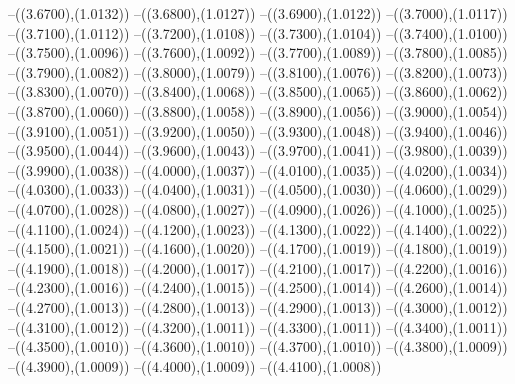 {	--({\sx*(3.6700)},{\sy*(1.0132)})
	--({\sx*(3.6800)},{\sy*(1.0127)})
	--({\sx*(3.6900)},{\sy*(1.0122)})
	--({\sx*(3.7000)},{\sy*(1.0117)})
	--({\sx*(3.7100)},{\sy*(1.0112)})
	--({\sx*(3.7200)},{\sy*(1.0108)})
	--({\sx*(3.7300)},{\sy*(1.0104)})
	--({\sx*(3.7400)},{\sy*(1.0100)})
	--({\sx*(3.7500)},{\sy*(1.0096)})
	--({\sx*(3.7600)},{\sy*(1.0092)})
	--({\sx*(3.7700)},{\sy*(1.0089)})
	--({\sx*(3.7800)},{\sy*(1.0085)})
	--({\sx*(3.7900)},{\sy*(1.0082)})
	--({\sx*(3.8000)},{\sy*(1.0079)})
	--({\sx*(3.8100)},{\sy*(1.0076)})
	--({\sx*(3.8200)},{\sy*(1.0073)})
	--({\sx*(3.8300)},{\sy*(1.0070)})
	--({\sx*(3.8400)},{\sy*(1.0068)})
	--({\sx*(3.8500)},{\sy*(1.0065)})
	--({\sx*(3.8600)},{\sy*(1.0062)})
	--({\sx*(3.8700)},{\sy*(1.0060)})
	--({\sx*(3.8800)},{\sy*(1.0058)})
	--({\sx*(3.8900)},{\sy*(1.0056)})
	--({\sx*(3.9000)},{\sy*(1.0054)})
	--({\sx*(3.9100)},{\sy*(1.0051)})
	--({\sx*(3.9200)},{\sy*(1.0050)})
	--({\sx*(3.9300)},{\sy*(1.0048)})
	--({\sx*(3.9400)},{\sy*(1.0046)})
	--({\sx*(3.9500)},{\sy*(1.0044)})
	--({\sx*(3.9600)},{\sy*(1.0043)})
	--({\sx*(3.9700)},{\sy*(1.0041)})
	--({\sx*(3.9800)},{\sy*(1.0039)})
	--({\sx*(3.9900)},{\sy*(1.0038)})
	--({\sx*(4.0000)},{\sy*(1.0037)})
	--({\sx*(4.0100)},{\sy*(1.0035)})
	--({\sx*(4.0200)},{\sy*(1.0034)})
	--({\sx*(4.0300)},{\sy*(1.0033)})
	--({\sx*(4.0400)},{\sy*(1.0031)})
	--({\sx*(4.0500)},{\sy*(1.0030)})
	--({\sx*(4.0600)},{\sy*(1.0029)})
	--({\sx*(4.0700)},{\sy*(1.0028)})
	--({\sx*(4.0800)},{\sy*(1.0027)})
	--({\sx*(4.0900)},{\sy*(1.0026)})
	--({\sx*(4.1000)},{\sy*(1.0025)})
	--({\sx*(4.1100)},{\sy*(1.0024)})
	--({\sx*(4.1200)},{\sy*(1.0023)})
	--({\sx*(4.1300)},{\sy*(1.0022)})
	--({\sx*(4.1400)},{\sy*(1.0022)})
	--({\sx*(4.1500)},{\sy*(1.0021)})
	--({\sx*(4.1600)},{\sy*(1.0020)})
	--({\sx*(4.1700)},{\sy*(1.0019)})
	--({\sx*(4.1800)},{\sy*(1.0019)})
	--({\sx*(4.1900)},{\sy*(1.0018)})
	--({\sx*(4.2000)},{\sy*(1.0017)})
	--({\sx*(4.2100)},{\sy*(1.0017)})
	--({\sx*(4.2200)},{\sy*(1.0016)})
	--({\sx*(4.2300)},{\sy*(1.0016)})
	--({\sx*(4.2400)},{\sy*(1.0015)})
	--({\sx*(4.2500)},{\sy*(1.0014)})
	--({\sx*(4.2600)},{\sy*(1.0014)})
	--({\sx*(4.2700)},{\sy*(1.0013)})
	--({\sx*(4.2800)},{\sy*(1.0013)})
	--({\sx*(4.2900)},{\sy*(1.0013)})
	--({\sx*(4.3000)},{\sy*(1.0012)})
	--({\sx*(4.3100)},{\sy*(1.0012)})
	--({\sx*(4.3200)},{\sy*(1.0011)})
	--({\sx*(4.3300)},{\sy*(1.0011)})
	--({\sx*(4.3400)},{\sy*(1.0011)})
	--({\sx*(4.3500)},{\sy*(1.0010)})
	--({\sx*(4.3600)},{\sy*(1.0010)})
	--({\sx*(4.3700)},{\sy*(1.0010)})
	--({\sx*(4.3800)},{\sy*(1.0009)})
	--({\sx*(4.3900)},{\sy*(1.0009)})
	--({\sx*(4.4000)},{\sy*(1.0009)})
	--({\sx*(4.4100)},{\sy*(1.0008)})
}
